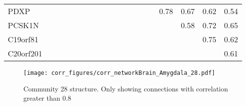 \begin{longtable}{lrrrrrrrrrrrrrrrrrr}
PDXP          &           &               &            &            &               &             &               &              &             &             &               &                     &               &            &         0.78 &           0.67 &            0.62 &          0.54 \\
PCSK1N        &           &               &            &            &               &             &               &              &             &             &               &                     &               &            &              &           0.58 &            0.72 &          0.65 \\
C19orf81      &           &               &            &            &               &             &               &              &             &             &               &                     &               &            &              &                &            0.75 &          0.62 \\
C20orf201     &           &               &            &            &               &             &               &              &             &             &               &                     &               &            &              &                &                 &          0.61 \\
\end{longtable}


\begin{figure}[h!]
\centering
\texttt{[image: corr\_figures/corr\_networkBrain\_Amygdala\_28.pdf]}
\caption{Community 28 structure. Only showing connections with correlation greater than 0.8}
\end{figure}




